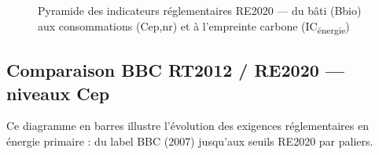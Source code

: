 \begin{figure}[H]
  \caption{Pyramide des indicateurs réglementaires RE2020 — du bâti (Bbio) aux consommations (Cep,nr) et à l'empreinte carbone (IC\textsubscript{énergie})}
  \label{fig:pyramide-re2020}
\end{figure}

\subsection{Comparaison BBC RT2012 / RE2020 — niveaux Cep}

Ce diagramme en barres illustre l'évolution des exigences réglementaires en énergie primaire : du label BBC (2007) jusqu'aux seuils RE2020 par paliers.

